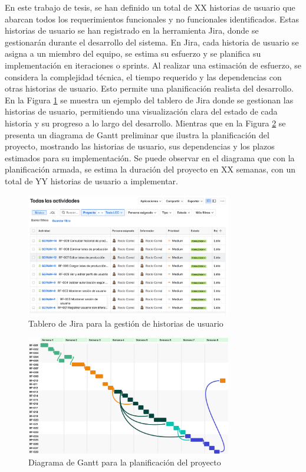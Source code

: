 En este trabajo de tesis, se han definido un total de XX historias de usuario que abarcan todos los requerimientos funcionales y no funcionales identificados. Estas historias de usuario se han registrado en la herramienta Jira, donde se gestionarán durante el desarrollo del sistema. En Jira, cada historia de usuario se asigna a un miembro del equipo, se estima su esfuerzo y se planifica su implementación en iteraciones o sprints. Al realizar una estimación de esfuerzo, se considera la complejidad técnica, el tiempo requerido y las dependencias con otras historias de usuario. Esto permite una planificación realista del desarrollo. En la Figura \ref{fig:jira-board} se muestra un ejemplo del tablero de Jira donde se gestionan las historias de usuario, permitiendo una visualización clara del estado de cada historia y su progreso a lo largo del desarrollo. Mientras que en la Figura \ref{fig:gantt-chart} se presenta un diagrama de Gantt preliminar que ilustra la planificación del proyecto, mostrando las historias de usuario, sus dependencias y los plazos estimados para su implementación. Se puede observar en el diagrama que con la planificación armada, se estima la duración del proyecto en XX semanas, con un total de YY historias de usuario a implementar.

\begin{figure}[!htpb]
	\centering
	\includegraphics[width=0.8\textwidth]{Figures/jira-board.png}
	\caption{Tablero de Jira para la gestión de historias de usuario}
	\label{fig:jira-board}
\end{figure}

\begin{figure}[!htpb]
	\centering
	\includegraphics[width=0.8\textwidth]{Figures/gantt-chart.png}
	\caption{Diagrama de Gantt para la planificación del proyecto}
	\label{fig:gantt-chart}
\end{figure}

